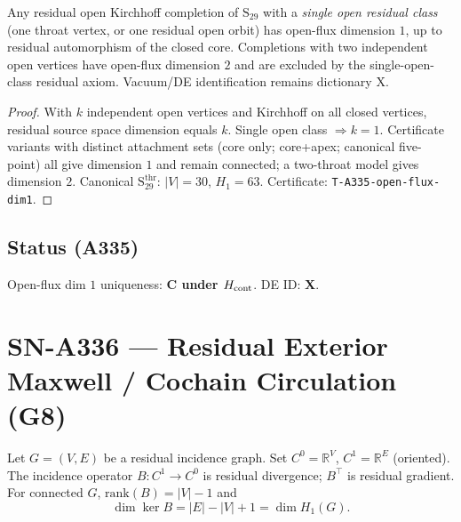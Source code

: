 \begin{theorem}
\label{thm:A335}
Any residual open Kirchhoff completion of $\mathrm{S}_{29}$ with a \emph{single open residual class} (one throat vertex, or one residual open orbit) has open-flux dimension $1$, up to residual automorphism of the closed core. Completions with two independent open vertices have open-flux dimension $2$ and are excluded by the single-open-class residual axiom. Vacuum/DE identification remains dictionary X.
\end{theorem}

\begin{proof}
With $k$ independent open vertices and Kirchhoff on all closed vertices, residual source space dimension equals $k$. Single open class $\Rightarrow k=1$. Certificate variants with distinct attachment sets (core only; core+apex; canonical five-point) all give dimension $1$ and remain connected; a two-throat model gives dimension $2$. Canonical $\mathrm{S}_{29}^{\mathrm{thr}}$: $|V|=30$, $H_1=63$. Certificate: \texttt{T-A335-open-flux-dim1}.
\end{proof}

\subsection*{Status (A335)}
Open-flux dim $1$ uniqueness: \textbf{C under $H_{\rm cont}$}. DE ID: \textbf{X}.

\section{SN-A336 --- Residual Exterior Maxwell / Cochain Circulation (G8)}
\label{sec:SN-A336}

\begin{definition}
\label{def:A336-cochain}
Let $G=(V,E)$ be a residual incidence graph. Set $C^0=\mathbb{R}^{V}$, $C^1=\mathbb{R}^{E}$ (oriented). The incidence operator $B:C^1\to C^0$ is residual divergence; $B^\top$ is residual gradient. For connected $G$, $\mathrm{rank}(B)=|V|-1$ and
\begin{equation}
\dim\ker B = |E|-|V|+1 = \dim H_1(G).
\end{equation}
\end{definition}

